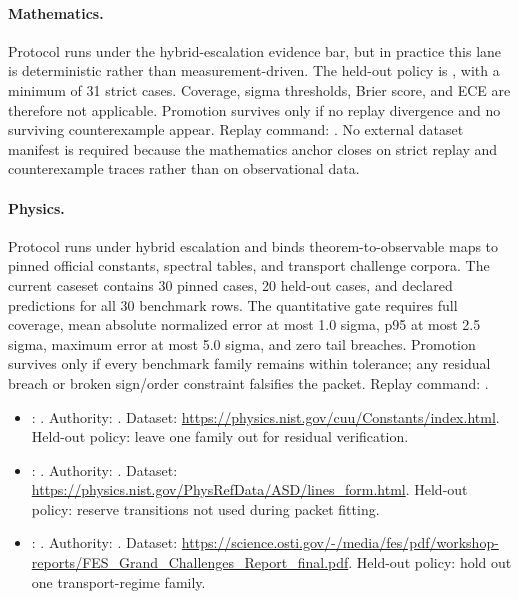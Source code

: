 \paragraph{Mathematics.}
Protocol  runs under the
hybrid-escalation evidence bar, but in practice this lane is deterministic
rather than measurement-driven. The held-out policy is
, with a minimum of 31
strict cases. Coverage, sigma thresholds, Brier score, and ECE are therefore
not applicable. Promotion survives only if no replay divergence and no
surviving counterexample appear. Replay command:
. No
external dataset manifest is required because the mathematics anchor closes on
strict replay and counterexample traces rather than on observational data.

\paragraph{Physics.}
Protocol  runs
under hybrid escalation and binds theorem-to-observable maps to pinned official
constants, spectral tables, and transport challenge corpora. The current
caseset contains 30 pinned cases, 20 held-out cases, and declared predictions
for all 30 benchmark rows. The quantitative gate requires full coverage, mean
absolute normalized error at most 1.0 sigma, p95 at most 2.5 sigma, maximum
error at most 5.0 sigma, and zero tail breaches. Promotion survives only if
every benchmark family remains within tolerance; any residual breach or broken
sign/order constraint falsifies the packet. Replay command:
.
\begin{itemize}[leftmargin=1.5em,nosep]
\item {}: . Authority: . Dataset: \url{https://physics.nist.gov/cuu/Constants/index.html}. Held-out policy: leave one family out for residual verification.
\item {}: . Authority: . Dataset: \url{https://physics.nist.gov/PhysRefData/ASD/lines_form.html}. Held-out policy: reserve transitions not used during packet fitting.
\item {}: . Authority: . Dataset: \url{https://science.osti.gov/-/media/fes/pdf/workshop-reports/FES_Grand_Challenges_Report_final.pdf}. Held-out policy: hold out one transport-regime family.
\end{itemize}

